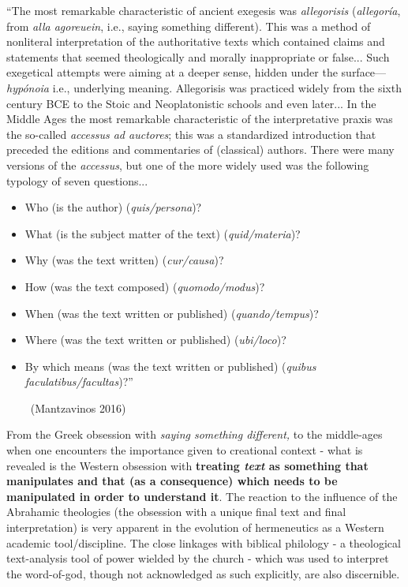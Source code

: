 \begin{myquote}
“The most remarkable characteristic of ancient exegesis was \textit{allegorisis} (\textit{allegoría}, from \textit{alla agoreuein}, i.e., saying something different). This was a method of nonliteral interpretation of the authoritative texts which contained claims and statements that seemed theologically and morally inappropriate or false... Such exegetical attempts were aiming at a deeper sense, hidden under the surface—\textit{hypónoia} i.e., underlying meaning. Allegorisis was practiced widely from the sixth century BCE to the Stoic and Neoplatonistic schools and even later... In the Middle Ages the most remarkable characteristic of the interpretative praxis was the so-called \textit{accessus ad auctores}; this was a standardized introduction that preceded the editions and commentaries of (classical) authors. There were many versions of the \textit{accessus}, but one of the more widely used was the following typology of seven questions...

\begin{itemize}
\itemsep=0pt
\item Who (is the author) (\textit{quis/persona})?

 \item What (is the subject matter of the text) (\textit{quid/materia})?

 \item Why (was the text written) (\textit{cur/causa})?

 \item How (was the text composed) (\textit{quomodo/modus})?

 \item When (was the text written or published) (\textit{quando/tempus})?

 \item Where (was the text written or published) (\textit{ubi/loco})?

 \item By which means (was the text written or published) (\textit{quibus faculatibus/facultas})?”

~\hfill (Mantzavinos 2016)

\end{itemize}
\end{myquote}

From the Greek obsession with \textit{saying something different,} to the middle-ages when one encounters the importance given to creational context - what is revealed is the Western obsession with \textbf{treating \textit{text} as something that manipulates and that (as a consequence) which needs to be manipulated in order to understand it}. The reaction to the influence of the Abrahamic theologies (the obsession with a unique final text and final interpretation) is very apparent in the evolution of hermeneutics as a Western academic tool/discipline. The close linkages with biblical philology - a theological text-analysis tool of power wielded by the church - which was used to interpret the word-of-god, though not acknowledged as such explicitly, are also discernible.

